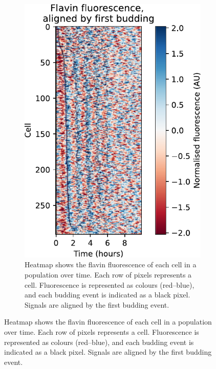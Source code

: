 \begin{figure}
  \centering
  \begin{subfigure}[htpb]{0.4\textwidth}
   \centering
   \includegraphics[width=\textwidth]{by4741_491_7.pdf}
   \caption{
    Heatmap shows the flavin fluorescence of each cell in a population over time.
    Each row of pixels represents a cell.
    Fluorescence is represented as colours (red--blue), and %
    each budding event is indicated as a black pixel.
    Signals are aligned by the first budding event.
}
\end{subfigure}
\end{figure}
